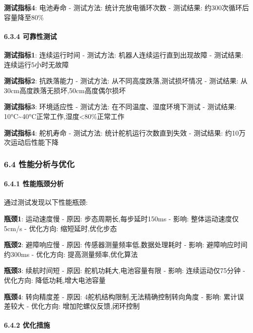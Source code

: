 \documentclass[
]{article}
\begin{document}
\textbf{测试指标4}: 电池寿命 - 测试方法: 统计充放电循环次数 - 测试结果:
约300次循环后容量降至80\%

\hypertarget{ux53efux9760ux6027ux6d4bux8bd5}{%
\paragraph{6.3.4 可靠性测试}\label{ux53efux9760ux6027ux6d4bux8bd5}}

\textbf{测试指标1}: 连续运行时间 - 测试方法: 机器人连续运行直到出现故障
- 测试结果: 连续运行5小时无故障

\textbf{测试指标2}: 抗跌落能力 - 测试方法: 从不同高度跌落,测试损坏情况 -
测试结果: 从30cm高度跌落无损坏,50cm高度偶尔损坏

\textbf{测试指标3}: 环境适应性 - 测试方法: 在不同温度、湿度环境下测试 -
测试结果: 10°C\textasciitilde40°C正常工作,湿度\textless80\%正常工作

\textbf{测试指标4}: 舵机寿命 - 测试方法: 统计舵机运行次数直到失效 -
测试结果: 约10万次运动后性能下降

\hypertarget{ux6027ux80fdux5206ux6790ux4e0eux4f18ux5316}{%
\subsubsection{6.4
性能分析与优化}\label{ux6027ux80fdux5206ux6790ux4e0eux4f18ux5316}}

\hypertarget{ux6027ux80fdux74f6ux9888ux5206ux6790}{%
\paragraph{6.4.1
性能瓶颈分析}\label{ux6027ux80fdux74f6ux9888ux5206ux6790}}

通过测试发现以下性能瓶颈:

\textbf{瓶颈1}: 运动速度慢 - 原因: 步态周期长,每步延时150ms - 影响:
整体运动速度仅5cm/s - 优化方向: 缩短延时,优化步态

\textbf{瓶颈2}: 避障响应慢 - 原因: 传感器测量频率低,数据处理耗时 - 影响:
避障响应时间约300ms - 优化方向: 提高测量频率,优化算法

\textbf{瓶颈3}: 续航时间短 - 原因: 舵机功耗大,电池容量有限 - 影响:
连续运动仅75分钟 - 优化方向: 降低功耗,增大电池容量

\textbf{瓶颈4}: 转向精度差 - 原因: 4舵机结构限制,无法精确控制转向角度 -
影响: 累计误差较大 - 优化方向: 增加陀螺仪反馈,闭环控制

\hypertarget{ux4f18ux5316ux63aaux65bd}{%
\paragraph{6.4.2 优化措施}\label{ux4f18ux5316ux63aaux65bd}}
\end{document}
